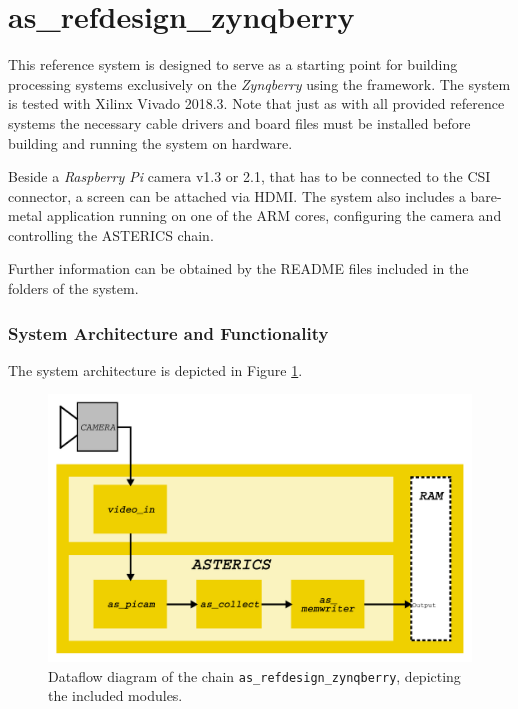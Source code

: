 \section{as\_refdesign\_zynqberry}
\label{sec:09-01-as_refdesign_zynqberry}

This reference system is designed to serve as a starting point for building processing systems exclusively on the \textit{Zynqberry} using the \asterics framework. The system is tested with Xilinx Vivado 2018.3. Note that just as with all provided reference systems the necessary cable drivers and board files must be installed before building and running the system on hardware.

Beside a \textit{Raspberry Pi} camera v1.3 or 2.1, that has to be connected to the CSI connector, a screen can be attached via HDMI. The system also includes a bare-metal application running on one of the ARM cores, configuring the camera and controlling the ASTERICS chain.

Further information can be obtained by the README files included in the folders of the system.

\subsubsection*{System Architecture and Functionality}

The system architecture is depicted in Figure \ref{fig:09-zynqberry-video-stream}.

\begin{figure}[htbp]
    \centering
    \includegraphics[width=\textwidth]{figs/09-as_refdesign_zynqberry.pdf}
    \caption{Dataflow diagram of the \asterics chain \texttt{as\_refdesign\_zynqberry}, depicting the included modules.}
    \label{fig:09-zynqberry-video-stream}
\end{figure}


